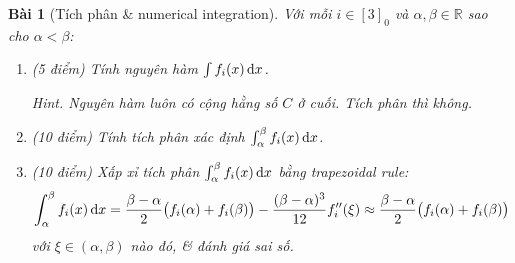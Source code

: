 \documentclass[12pt]{article}
\newtheorem{baitoan}{Bài}
\begin{document}
\begin{baitoan}[Tích phân \& numerical integration]
	Với mỗi $i\in[3]_0$ và $\alpha, \beta \in \mathbb{R}$ sao cho $\alpha < \beta$:
	\begin{enumerate}[label=(\alph*)]
		\item {\rm(5 điểm)} Tính nguyên hàm $\int f_i(x)\,{\rm d}x$.
		
		{\sf Hint.} Nguyên hàm luôn có cộng hằng số $C$ ở cuối. Tích phân thì không.
		\item {\rm(10 điểm)} Tính tích phân xác định $\int_\alpha^\beta f_i(x)\,{\rm d}x$. 
		\item {\rm(10 điểm)} Xấp xỉ tích phân $\int_\alpha^\beta f_i(x)\,{\rm d}x$ bằng trapezoidal rule:
		\begin{equation*}
			\int_\alpha^\beta f_i(x)\,{\rm d}x = \frac{\beta - \alpha}{2}\big(f_i(\alpha) + f_i(\beta)\big) - \frac{(\beta - \alpha)^3}{12}f_i''(\xi) \approx \frac{\beta - \alpha}{2}\big(f_i(\alpha) + f_i(\beta)\big)
		\end{equation*}
		với $\xi\in(\alpha,\beta)$ nào đó, \& đánh giá sai số.
	\end{enumerate}
\end{baitoan}



\printbibliography[heading=bibintoc]
\end{document}
